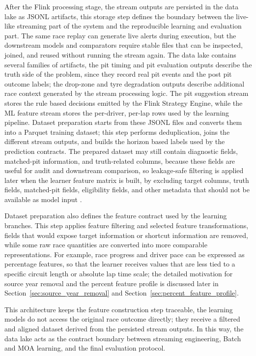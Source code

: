 After the Flink processing stage, the stream outputs are persisted in the data lake as JSONL artifacts, this storage step defines the boundary between the live-like streaming part of
the system and the reproducible learning and evaluation part. The same race replay can generate live alerts during execution, but the downstream models and comparators require
stable files that can be inspected, joined, and reused without running the stream again.
The data lake contains several families of artifacts, the pit timing and pit evaluation outputs describe the truth side of the problem, since they record real pit events and the
post pit outcome labels; the drop-zone and tyre degradation outputs describe additional race context generated by the stream processing logic. The pit suggestion stream stores the
rule based decisions emitted by the Flink Strategy Engine, while the ML feature stream stores the per-driver, per-lap rows used by the learning pipeline.
Dataset preparation starts from these JSONL files and converts them into a Parquet training dataset; this step performs deduplication, joins the different stream outputs,
and builds the horizon based labels used by the prediction contracts. The prepared dataset may still contain diagnostic fields, matched-pit information, and truth-related columns,
because these fields are useful for audit and downstream comparison, so leakage-safe filtering is applied later when the learner feature matrix is built, by excluding target columns,
truth fields, matched-pit fields, eligibility fields, and other metadata that should not be available as model input \cite{brookshire2024leakage}.

Dataset preparation also defines the feature contract used by the learning branches.
This step applies feature filtering and selected feature transformations, fields that would expose target information or shortcut information are removed, while some
raw race quantities are converted into more comparable representations. For example, race progress and driver pace can be expressed as percentage features, so
that the learner receives values that are less tied to a specific circuit length or absolute lap time scale; the detailed motivation for source year removal and the percent
feature profile is discussed later in Section~\ref{sec:source_year_removal} and Section~\ref{sec:percent_feature_profile}.

This architecture keeps the feature construction step traceable, the learning models do not access the original race outcome directly; they receive a filtered and aligned dataset
derived from the persisted stream outputs. In this way, the data lake acts as the contract boundary between streaming engineering, Batch and MOA learning, and the final evaluation
protocol.

